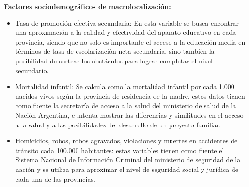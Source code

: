 \documentclass[12pt,a4paper]{article}
\begin{document}
\textbf{Factores sociodemográficos de macrolocalización:}
\begin{itemize}

\item Tasa de promoción efectiva secundaria: En esta variable se busca encontrar una aproximación a la calidad y efectividad del aparato educativo en cada provincia, siendo que no solo es importante el acceso a la educación media en términos de tasa de escolarización neta secundaria, sino también la posibilidad de sortear los obstáculos para lograr completar el nivel secundario.

\item Mortalidad infantil: Se calcula como la mortalidad infantil por cada 1.000 nacidos vivos según la provincia de residencia de la madre, estos datos tienen como fuente la secretaría de acceso a la salud del ministerio de salud de la Nación Argentina, e intenta mostrar las diferencias y similitudes en el acceso a la salud y a las posibilidades del desarrollo de un proyecto familiar.

\item Homicidios, robos, robos agravados, violaciones y muertes en accidentes de tránsito cada 100.000 habitantes: estas variables tienen como fuente el Sistema Nacional de Información Criminal del ministerio de seguridad de la nación y se utiliza para aproximar el nivel de seguridad social y jurídica de cada una de las provincias.
\end{itemize}
\end{document}
